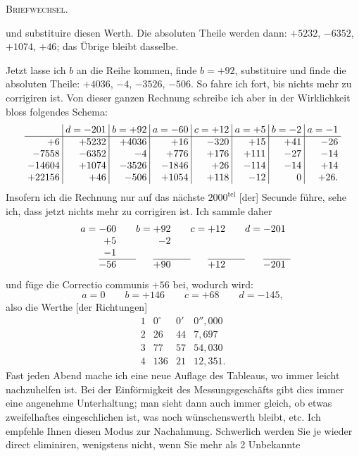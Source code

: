 \clearpage
{}\hfill\textsc{Briefwechsel.}\hfill\mbox{}\par\medskip
\noindent und substituire diesen Werth. Die absoluten Theile werden dann: $+5232$, $-6352$, $+1074$, $+46$; das Übrige bleibt dasselbe.

Jetzt lasse ich $b$ an die Reihe kommen, finde $b=+92$, substituire und finde die absoluten Theile: $+4036$, $-4$, $-3526$, $-506$. So fahre ich fort, bis nichts mehr zu corrigiren ist. Von dieser ganzen Rechnung schreibe ich aber in der Wirklichkeit bloss folgendes Schema:
\[
\setlength{\arraycolsep}{3pt}
\begin{array}{r|r|r|r|r|r|r|r}
&d=-201&b=+92&a=-60&c=+12&a=+5&b=-2&a=-1\\ \hline
+6&+5232&+4036&+16&-320&+15&+41&-26\\
-7558&-6352&-4&+776&+176&+111&-27&-14\\
-14604&+1074&-3526&-1846&+26&-114&-14&+14\\
+22156&+46&-506&+1054&+118&-12&0&+26.
\end{array}
\]
Insofern ich die Rechnung nur auf das nächste $2000^{\mathrm{tel}}$ [der] Secunde führe, sehe ich, dass jetzt nichts mehr zu corrigiren ist. Ich sammle daher
\[
\begin{array}{r@{\;}c@{\;}r@{\qquad}r@{\;}c@{\;}r@{\qquad}r@{\;}c@{\;}r@{\qquad}r@{\;}c@{\;}r}
a&=&-60&b&=&+92&c&=&+12&d&=&-201\\
&&+5&&&-2&&&&&&\\
&&-1&&&&&&&&&\\ \cline{3-3}\cline{6-6}\cline{9-9}\cline{12-12}
&&-56&&&+90&&&+12&&&-201
\end{array}
\]
und füge die Correctio communis $+56$ bei, wodurch wird:
\[
a=0\qquad b=+146\qquad c=+68\qquad d=-145,
\]
also die Werthe [der Richtungen]
\[
\begin{array}{r|rrr}
1&0^\circ&0'&0''{,}000\\
2&26&44&7{,}697\\
3&77&57&54{,}030\\
4&136&21&12{,}351.
\end{array}
\]
Fast jeden Abend mache ich eine neue Auflage des Tableaus, wo immer leicht nachzuhelfen ist. Bei der Einförmigkeit des Messungsgeschäfts gibt dies immer eine angenehme Unterhaltung; man sieht dann auch immer gleich, ob etwas zweifelhaftes eingeschlichen ist, was noch wünschenswerth bleibt, etc. Ich empfehle Ihnen diesen Modus zur Nachahmung. Schwerlich werden Sie je wieder direct eliminiren, wenigstens nicht, wenn Sie mehr als 2 Unbekannte

